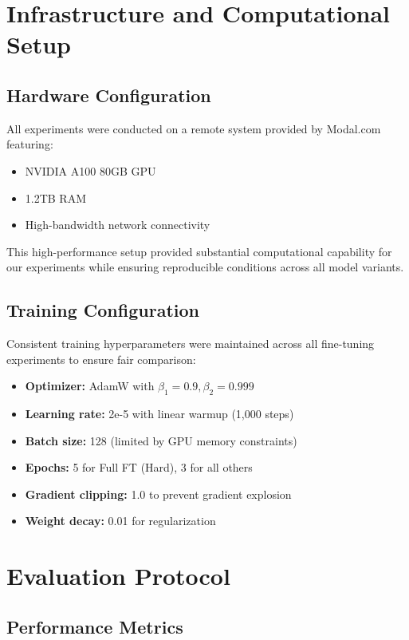 \section{Infrastructure and Computational Setup}

\subsection{Hardware Configuration}

All experiments were conducted on a remote system provided by Modal.com \cite{modal2023} featuring:
\begin{itemize}
\item NVIDIA A100 80GB GPU
\item 1.2TB RAM
\item High-bandwidth network connectivity
\end{itemize}

This high-performance setup provided substantial computational capability for our experiments while ensuring reproducible conditions across all model variants.

\subsection{Training Configuration}

Consistent training hyperparameters were maintained across all fine-tuning experiments to ensure fair comparison:

\begin{itemize}
\item \textbf{Optimizer:} AdamW \cite{loshchilov2017decoupled} with $\beta_1=0.9, \beta_2=0.999$
\item \textbf{Learning rate:} 2e-5 with linear warmup (1,000 steps)
\item \textbf{Batch size:} 128 (limited by GPU memory constraints)
\item \textbf{Epochs:} 5 for Full FT (Hard), 3 for all others
\item \textbf{Gradient clipping:} 1.0 to prevent gradient explosion
\item \textbf{Weight decay:} 0.01 for regularization
\end{itemize}

\section{Evaluation Protocol}

\subsection{Performance Metrics}

